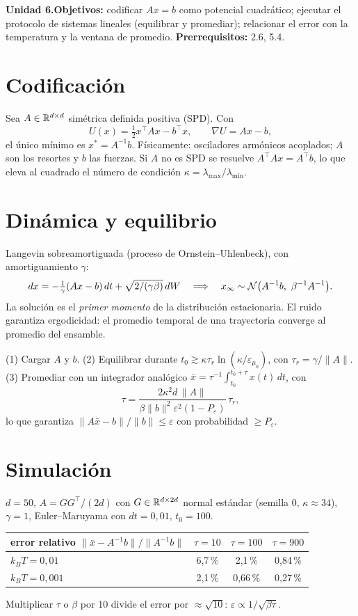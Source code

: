 \documentclass[11pt,a4paper]{article}
\begin{document}

\noindent\textbf{Unidad 6.}\quad\textbf{Objetivos:} codificar $Ax=b$ como potencial cuadrático; ejecutar el protocolo de sistemas lineales (equilibrar y
promediar); relacionar el error con la temperatura y la ventana de promedio.
\textbf{Prerrequisitos:} 2.6, 5.4.

\section{Codificación}
Sea $A\in\mathbb{R}^{d\times d}$ simétrica definida positiva (SPD). Con
\[U(x)=\tfrac12x^\top Ax-b^\top x,\qquad\nabla U=Ax-b,\]
el único mínimo es $x^\ast=A^{-1}b$. Físicamente: osciladores armónicos acoplados; $A$ son los resortes y $b$ las fuerzas. Si $A$ no es SPD se resuelve
$A^\top Ax=A^\top b$, lo que eleva al cuadrado el número de condición $\kappa=\lambda_{\max}/\lambda_{\min}$.

\section{Dinámica y equilibrio}
Langevin sobreamortiguada (proceso de Ornstein--Uhlenbeck), con amortiguamiento $\gamma$:
\[dx=-\tfrac1\gamma(Ax-b)\,dt+\sqrt{2/(\gamma\beta)}\,dW\quad\Longrightarrow\quad x_\infty\sim\mathcal{N}\big(A^{-1}b,\ \beta^{-1}A^{-1}\big).\]
La solución es el \emph{primer momento} de la distribución estacionaria. El ruido garantiza ergodicidad: el promedio temporal de una trayectoria converge al
promedio del ensamble.

\begin{definicion}
(1) Cargar $A$ y $b$. (2) Equilibrar durante $t_0\gtrsim\kappa\tau_r\ln(\kappa/\varepsilon_{\mu_0})$, con $\tau_r=\gamma/\|A\|$. (3) Promediar con un integrador
analógico $\bar x=\tau^{-1}\int_{t_0}^{t_0+\tau}x(t)\,dt$, con
\[\tau=\frac{2\kappa^2d\,\|A\|}{\beta\|b\|^2\varepsilon^2(1-P_\varepsilon)}\,\tau_r,\]
lo que garantiza $\|A\bar x-b\|/\|b\|\le\varepsilon$ con probabilidad $\ge P_\varepsilon$.
\end{definicion}

\section{Simulación \evS}
$d=50$, $A=GG^\top/(2d)$ con $G\in\mathbb{R}^{d\times2d}$ normal estándar (semilla 0, $\kappa\approx34$), $\gamma=1$, Euler--Maruyama con $dt=0{,}01$, $t_0=100$.
\begin{center}\begin{tabular}{lccc}\toprule
error relativo $\|\bar x-A^{-1}b\|/\|A^{-1}b\|$ & $\tau=10$ & $\tau=100$ & $\tau=900$\\\midrule
$k_BT=0{,}01$ & 6,7\,\% & 2,1\,\% & 0,84\,\%\\
$k_BT=0{,}001$ & 2,1\,\% & 0,66\,\% & 0,27\,\%\\\bottomrule\end{tabular}\end{center}
Multiplicar $\tau$ o $\beta$ por 10 divide el error por $\approx\sqrt{10}$: $\varepsilon\propto1/\sqrt{\beta\tau}$.
\end{document}
